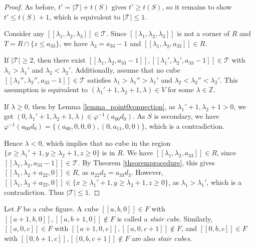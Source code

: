\documentclass[12pt]{article}
\theoremstyle{remark}
\begin{document}
\begin{proof}
    As before, $t' = | \mathcal{T}| + t(S)$ gives $t' \geq  t(S)$, so it remains to show $t' \leq t(S)+1 $, which is equivalent to $|\mathcal{T}| \leq 1$.

    Consider any $[[\lambda_1,\lambda_2,\lambda_3]] \in \mathcal{T}$. Since $[[\lambda_1,\lambda_2,\lambda_3]]$ is not a corner of $R$ and $T = R \cap \{z \leq a_{33}\} $, we have $\lambda_3 = a_{33}-1$ and $[[\lambda_1,\lambda_2,a_{33}]] \in R$.
    
    If $|\mathcal{T}| \geq 2$, then there exist $[[\lambda_1,\lambda_2,a_{33}-1]],  [[\lambda_1',\lambda_2',a_{33}-1]] \in \mathcal{T}$ with $\lambda_1 > \lambda_1'$ and $\lambda_2 < \lambda_2'$. Additionally, assume that no cube $[[\lambda_1'',\lambda_2'',a_{33}-1]] \in \mathcal{T}$ satisfies $\lambda_1 > \lambda_1'' > \lambda_1'$ and $\lambda_2 < \lambda_2'' < \lambda_2'$. This assumption is equivalent to $(\lambda_1'+1,\lambda_2+1,\lambda) \in V$ for some $\lambda \in \mathbb{Z}$. 
    
    If $\lambda \geq 0$, then by Lemma \ref{lemma_point0connection}, as $\lambda_1'+1,\lambda_2+1 > 0$, we get $(0,\lambda_1'+1,\lambda_2+1,\lambda) \in \varphi^{-1}(a_{00}d_0)$. As $S$ is secondary, we have $\varphi^{-1}(a_{00}d_0) = \{(a_{00},0,0,0),(0,a_{11},0,0)\}$, which is a contradiction. 
    
    Hence $\lambda < 0$, which implies that no cube in the region $\{x \geq \lambda_1'+1, y \geq  \lambda_2+1, z \geq 0\}$ is in $R$. We have $[[\lambda_1,\lambda_2,a_{33}]] \in R$, since $[[\lambda_1,\lambda_2,a_{33}-1]] \in \mathcal{T}$. By Theorem \ref{theoremprocedure}, this gives $[[\lambda_1,\lambda_2+a_{22},0]] \in R$, as $a_{22}d_2 = a_{33}d_3$. However, $[[\lambda_1,\lambda_2+a_{22},0]] \in \{x \geq \lambda_1'+1, y \geq  \lambda_2+1, z \geq 0\}$, as $\lambda_1 > \lambda_1'$, which is a contradiction. Thus $|\mathcal{T}| \leq 1$.   
\end{proof}












Let $F$ be a cube figure.
A cube $[[a,b,0]] \in F$ with $[[a+1,b,0]], [[a,b+1,0]] \notin F$ is called a \emph{stair cube}. Similarly, $[[a,0,c]] \in F$ with $[[a+1,0,c]], [[a,0,c+1]] \notin F$, and $[[0,b,c]] \in F$ with $[[0,b+1,c]], [[0,b,c+1]] \notin F$ are also \emph{stair cubes}.  
\end{document}
